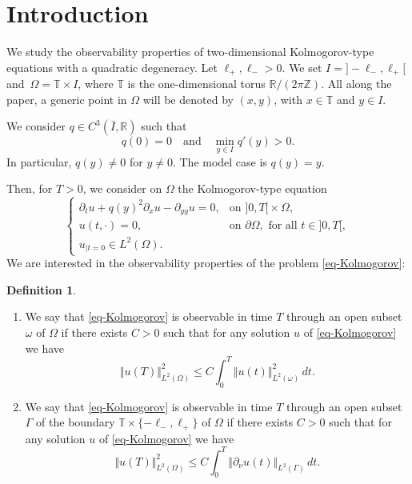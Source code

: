 \documentclass[JEP,XML,SOM,Unicode]{cedram}
\theoremstyle{plain}
\theoremstyle{definition}
\newtheorem{definition}[theorem]{Definition}
\newcommand{\nr}[1]{\Vert #1\Vert}
\newcommand{\1}{\mathds 1}
\newcommand{\R}{\mathbb{R}}
\newcommand{\Z}{\mathbb{Z}}
\newcommand{\T}{\mathbb{T}}
\let\G\Gamma
\let\o\omega
\let\O\Omega
\begin{document}
\maketitle
\vspace*{-\baselineskip}\enlargethispage{\baselineskip}%
\tableofcontents


\section{Introduction}

We study the observability properties of two-dimensional Kolmogorov-type equations with a quadratic degeneracy. Let $\ell_+, \ell_- >0$. We set $I ={} ]-\ell_-,\ell_+[$ and~$\O = \T \times I$, where $\T$ is the one-dimensional torus $\R / (2 \pi \Z)$. All along the paper, a generic point in $\O$ will be denoted by $(x,y)$, with $x \in \T$ and $y \in I$.

We consider $q \in C^3 (\bar I,\R)$ such that
\[
q(0) = 0 \quad \text{and} \quad \min_{y \in I} q'(y) > 0.
\]
In particular, $q(y) \neq 0$ for $y \neq 0$. The model case is $q(y) = y$.

Then, for $T > 0$, we consider on $\O$ the Kolmogorov-type equation
\begin{equation} \label{eq-Kolmogorov}
\begin{cases}
\partial_t u + q(y)^2 \partial_x u - \partial_{yy} u = 0, & \text{on } ]0,T[{}\times \O,\\
u(t,\cdot) = 0, & \text{on } \partial\O, \text{ for all } t \in{}]0,T[,\\
u_{|t=0} \in L^2 (\O).
\end{cases}
\end{equation}
We are interested in the observability properties of the problem \eqref{eq-Kolmogorov}:

\skpt
\begin{definition}
\begin{enumerate}
\item We say that \eqref{eq-Kolmogorov} is observable in time $T$ through an open subset $\omega$ of $\O$ if there exists $C > 0$ such that for any solution $u$ of \eqref{eq-Kolmogorov} we have
\begin{equation} \label{eq-obs-vol}
\nr{u(T)}_{L^2(\O)}^2 \leq C \int_0^T \nr{u(t)}_{L^2(\o)}^2 \, dt.
\end{equation}
\item We say that \eqref{eq-Kolmogorov} is observable in time $T$ through an open subset $\Gamma$ of the boundary $\T \times \{-\ell_-,\ell_+\}$ of $\O$ if there exists $C > 0$ such that for any solution $u$ of \eqref{eq-Kolmogorov} we have
\begin{equation} \label{eq-obs-Gamma}
\nr{u(T)}_{L^2(\O)}^2 \leq C \int_0^T \nr{\partial_\nu u(t)}_{L^2(\G)} \, dt.
\end{equation}
\end{enumerate}
\end{definition}
\end{document}
